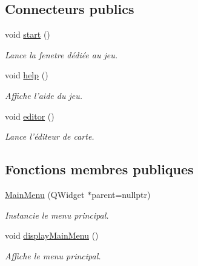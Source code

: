 \subsection*{Connecteurs publics}
\begin{DoxyCompactItemize}
\item 
\hypertarget{classMainMenu_af13a5defbd470cb18edc59d14668aaf4}{void \hyperlink{classMainMenu_af13a5defbd470cb18edc59d14668aaf4}{start} ()}\label{classMainMenu_af13a5defbd470cb18edc59d14668aaf4}

\begin{DoxyCompactList}\small\item\em Lance la fenetre dédiée au jeu. \end{DoxyCompactList}\item 
\hypertarget{classMainMenu_aea2e199d621268d691f1aebb7a8f2e31}{void \hyperlink{classMainMenu_aea2e199d621268d691f1aebb7a8f2e31}{help} ()}\label{classMainMenu_aea2e199d621268d691f1aebb7a8f2e31}

\begin{DoxyCompactList}\small\item\em Affiche l’aide du jeu. \end{DoxyCompactList}\item 
\hypertarget{classMainMenu_adbce95d3c2192a684d25e6bf2417f073}{void \hyperlink{classMainMenu_adbce95d3c2192a684d25e6bf2417f073}{editor} ()}\label{classMainMenu_adbce95d3c2192a684d25e6bf2417f073}

\begin{DoxyCompactList}\small\item\em Lance l’éditeur de carte. \end{DoxyCompactList}\end{DoxyCompactItemize}
\subsection*{Fonctions membres publiques}
\begin{DoxyCompactItemize}
\item 
\hyperlink{classMainMenu_a891bed1e0edb5492671c332cb89b7a9a}{Main\+Menu} (Q\+Widget $\ast$parent=nullptr)
\begin{DoxyCompactList}\small\item\em Instancie le menu principal. \end{DoxyCompactList}\item 
\hypertarget{classMainMenu_a4b83847fe6109626f6dd4404c8afe4b2}{void \hyperlink{classMainMenu_a4b83847fe6109626f6dd4404c8afe4b2}{display\+Main\+Menu} ()}\label{classMainMenu_a4b83847fe6109626f6dd4404c8afe4b2}

\begin{DoxyCompactList}\small\item\em Affiche le menu principal. \end{DoxyCompactList}\end{DoxyCompactItemize}


